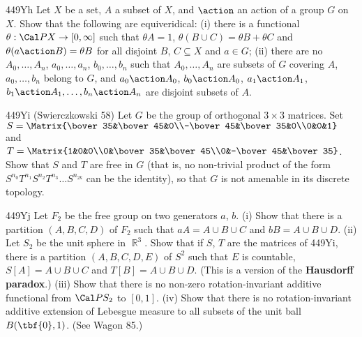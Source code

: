 {\spheader 449Yh
Let $X$ be a set, $A$ a subset of $X$, and $\action$ an
action of a group $G$ on $X$.
Show that the following are equiveridical:  (i)
there is a functional $\theta:\Cal PX\to[0,\infty]$ such that
$\theta A=1$, $\theta(B\cup C)=\theta B+\theta C$ and
$\theta(a\action B)=\theta B$ for all disjoint
$B$, $C\subseteq X$ and $a\in G$;   (ii) there are no
$A_0,\ldots,A_n$, $a_0,\ldots,a_n$, $b_0,\ldots,b_n$ such that
$A_0,\ldots,A_n$ are subsets of $G$ covering $A$,
$a_0,\ldots,b_n$ belong to $G$, and $a_0\action A_0$,
$b_0\action A_0$,
$a_1\action A_1$, $b_1\action A_1,\ldots,b_n\action A_n$ are
disjoint subsets of $A$.

\spheader 449Yi ({\smc Swierczkowski 58}) Let $G$ be the group of
orthogonal $3\times 3$ matrices.   Set
$S=\Matrix{\bover35&\bover45&0\\-\bover45&\bover35&0\\0&0&1}$ and
$T=\Matrix{1&0&0\\0&\bover35&\bover45\\0&-\bover45&\bover35}$.   Show
that $S$ and $T$ are free in $G$ (that is, no non-trivial product
of the form $S^{n_0}T^{n_1}S^{n_2}T^{n_3}\ldots
S^{n_{2k}}$ can be the identity), so that
$G$ is not amenable in its discrete topology.   

\spheader 449Yj
Let $F_2$ be the free group on two generators $a$,
$b$.   (i) Show that there is a partition $(A,B,C,D)$ of
$F_2$ such that $aA=A\cup B\cup C$ and $bB=A\cup B\cup D$.
(ii) Let $S_2$ be the unit
sphere in $\BbbR^3$.   Show that if $S$, $T$ are the matrices of
449Yi, there is a partition $(A,B,C,D,E)$ of $S^2$ such that
$E$ is countable, $S[A]=A\cup B\cup C$ and $T[B]=A\cup B\cup D$.
(This is a version of the {\bf Hausdorff paradox}.)
(iii) Show that there is no non-zero rotation-invariant additive
functional from $\Cal PS_2$ to $[0,1]$.   (iv) Show that there is no
rotation-invariant additive
extension of Lebesgue measure to all subsets of the
unit ball $B(\tbf{0},1)$.   (See {\smc Wagon 85}.)
}%

